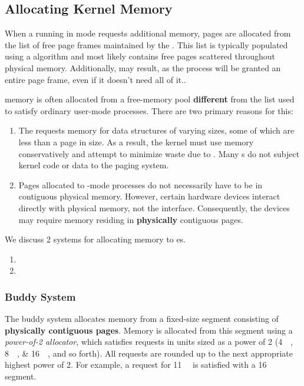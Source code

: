 \subsection{Allocating Kernel Memory}\label{subsec:Allocating_Kernel_Memory}
When a  running in  mode requests additional memory, pages are allocated from the list of free page frames maintained by the .
This list is typically populated using a  algorithm and most likely contains free pages scattered throughout physical memory.
Additionally,  may result, as the process will be granted an entire page frame, even if it doesn't need all of it..

 memory is often allocated from a free-memory pool \textbf{different} from the list used to satisfy ordinary user-mode processes.
There are two primary reasons for this:
\begin{enumerate}[noitemsep]
\item The  requests memory for data structures of varying sizes, some of which are less than a page in size.
  As a result, the kernel must use memory conservatively and attempt to minimize waste due to .
  Many s do not subject kernel code or data to the paging system.
\item Pages allocated to -mode processes do not necessarily have to be in contiguous physical memory.
  However, certain hardware devices interact directly with physical memory, not the  interface.
  Consequently, the devices may require memory residing in \textbf{physically} contiguous pages.
\end{enumerate}

We discuss 2 systems for allocating memory to  es.
\begin{enumerate}[noitemsep]
\item {}
\item {}
\end{enumerate}

\subsubsection{Buddy System}\label{subsubsec:Buddy_System}
The buddy system allocates memory from a fixed-size segment consisting of \textbf{physically contiguous pages}.
Memory is allocated from this segment using a \emph{power-of-2 allocator}, which satisfies requests in units sized as a power of 2 (\SIlist{4;8;16}{\kibi{} \byte{}}, and so forth).
All requests are rounded up to the next appropriate highest power of 2.
For example, a request for \SI{11}{\kibi{} \byte{}} is satisfied with a \SI{16}{\kibi{} \byte{}} segment.

